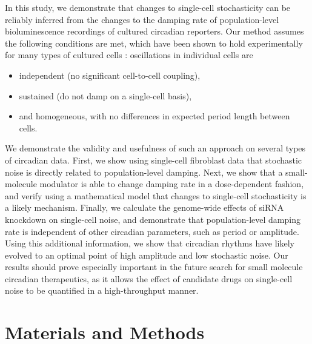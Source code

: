\documentclass[11pt, letterpaper]{article}
\begin{document}
In this study, we demonstrate that changes to single-cell stochasticity can be reliably inferred from the changes to the damping rate of population-level bioluminescence recordings of cultured circadian reporters.
Our method assumes the following conditions are met, which have been shown to hold experimentally for many types of cultured cells \cite{Nagoshi2004, Welsh2004, Guenthner2014, Noguchi2013}:
oscillations in individual cells are
\begin{itemize}
  \item independent (no significant cell-to-cell coupling),
  \item sustained (do not damp on a single-cell basis),
  \item and homogeneous, with no differences in expected period length between cells.
\end{itemize}
We demonstrate the validity and usefulness of such an approach on several types of circadian data.
First, we show using single-cell fibroblast data that stochastic noise is directly related to population-level damping.
Next, we show that a small-molecule modulator is able to change damping rate in a dose-dependent fashion, and verify using a mathematical model that changes to single-cell stochasticity is a likely mechanism.
Finally, we calculate the genome-wide effects of siRNA knockdown on single-cell noise, and demonstrate that population-level damping rate is independent of other circadian parameters, such as period or amplitude.
Using this additional information, we show that circadian rhythms have likely evolved to an optimal point of high amplitude and low stochastic noise.
Our results should prove especially important in the future search for small molecule circadian therapeutics, as it allows the effect of candidate drugs on single-cell noise to be quantified in a high-throughput manner.


\section*{Materials and Methods}
\end{document}
